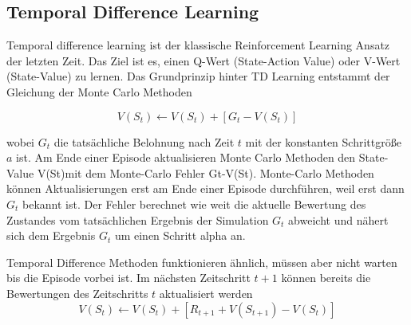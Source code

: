 \subsection{Temporal Difference Learning}
Temporal difference learning ist der klassische Reinforcement Learning Ansatz der letzten Zeit. Das Ziel ist es, einen Q-Wert (State-Action Value) oder V-Wert (State-Value) zu lernen. Das Grundprinzip hinter TD Learning entstammt der Gleichung der Monte Carlo Methoden

\begin{equation}
V(S_t) \leftarrow V(S_t) + [G_t-V(S_t)] 
\end{equation}

wobei $G_t$ die tatsächliche Belohnung nach Zeit $t$ mit der konstanten Schrittgröße $a$ ist. Am Ende einer Episode aktualisieren Monte Carlo Methoden den State-Value V(St)mit dem Monte-Carlo Fehler Gt-V(St). Monte-Carlo Methoden können Aktualisierungen erst am Ende einer Episode durchführen, weil erst dann $G_t$ bekannt ist. Der Fehler berechnet wie weit die aktuelle Bewertung des Zustandes vom tatsächlichen Ergebnis der Simulation $G_t$ abweicht und nähert sich dem Ergebnis $G_t$ um einen Schritt alpha an.
\par
Temporal Difference Methoden funktionieren ähnlich, müssen aber nicht warten bis die Episode vorbei ist. Im nächsten Zeitschritt $t+1$ können bereits die Bewertungen des Zeitschritts $t$ aktualisiert werden
\begin{equation}
V(S_t) \leftarrow V(S_t)+[R_{t+1}+V(S_{t+1})-V(S_t)]
\end{equation}

